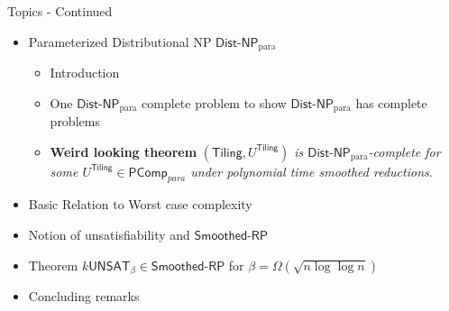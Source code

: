 \begin{frame}{Topics - Continued}
    \begin{itemize}
        \item Parameterized Distributional NP $\textsf{Dist-NP}_{\text{para}}$
            \begin{itemize}
                \item Introduction
                \item One $\textsf{Dist-NP}_{\text{para}}$ complete problem to show $\textsf{Dist-NP}_{\text{para}}$ has complete problems
                \item \textbf{Weird looking theorem} \textit{$(\textsf{Tiling}, U^{\textsf{Tiling}})$ is $\textsf{Dist-NP}_{\text{para}}$-complete for some $U^{\textsf{Tiling}} \in \textsf{PComp}_{para}$ under polynomial time smoothed reductions}.
            \end{itemize}

        \item Basic Relation to Worst case complexity
        \item Notion of unsatisfiability and $\textsf{Smoothed-RP}$
        \item Theorem $k \textsf{UNSAT}_{\beta} \in \textsf{Smoothed-RP}$ for $\beta = \Omega(\sqrt{n \log \log n})$
        \item Concluding remarks
    \end{itemize}
\end{frame}